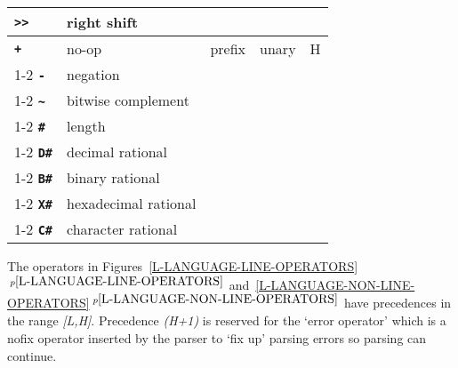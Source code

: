 \documentclass[12pt]{article}
\newcommand{\ttkey}[1]{{\tt \bfseries #1}}
\newcommand{\itemref}[1]{\ref{#1}$\,^{p\pageref{#1}}$}
\newlength{\figurewidth}
\newenvironment{boxedfigure}[1][!btp]%
	{\begin{figure*}[#1]
	 \begin{lrbox}{\figurebox}
	 \begin{minipage}{\figurewidth}

	 \vspace*{1ex}}%
	{
	 \vspace*{1ex}

	 \end{minipage}
	 \end{lrbox}

	 \centering
	 \fbox{\hspace*{0.1in}\usebox{\figurebox}\hspace*{0.1in}}
	 \end{figure*}}
\begin{document}
\begin{boxedfigure}[!t]
\begin{center}
\begin{tabular}{|l|l|l|l|r|}
\ttkey{>{}>}  & right shift & & &
\\\hline
\ttkey{+}  & no-op & prefix & unary & H
\\\cline{1-2}
\ttkey{-}  & negation & & & 
\\\cline{1-2}
\ttkey{\textasciitilde}  & bitwise complement & & & 
\\\cline{1-2}
\ttkey{\#}  & length & & & 
\\\cline{1-2}
\ttkey{D\#}  & decimal rational & & & 
\\\cline{1-2}
\ttkey{B\#}  & binary rational & & & 
\\\cline{1-2}
\ttkey{X\#}  & hexadecimal rational & & & 
\\\cline{1-2}
\ttkey{C\#}  & character rational & & & 
\\\hline

\end{tabular}
\end{center}

\caption{L-Language Non-Line Operators}
\label{L-LANGUAGE-NON-LINE-OPERATORS}
\end{boxedfigure}

\clearpage

The operators in
Figures~\itemref{L-LANGUAGE-LINE-OPERATORS}
and~\itemref{L-LANGUAGE-NON-LINE-OPERATORS}
have precedences in
the range {\em [L,H]}.
Precedence {\em (H+1)} is reserved for the `error operator' which is a
nofix operator inserted by the parser to `fix up' parsing errors
so parsing can continue.
\end{document}
